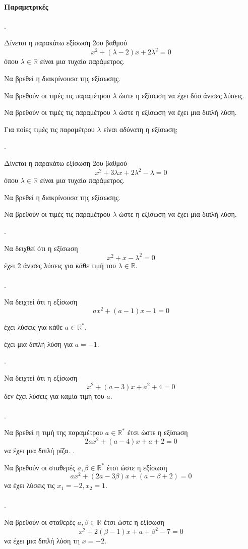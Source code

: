 \documentclass[11pt,a4paper,twocolumn]{article}
\newcounter{askhsh}
\newcommand{\askhsh}{{\large\theaskhsh.}\ \addtocounter{askhsh}{1}}
\begin{document}
\paragraph{Παραμετρικές}
\askhsh
Δίνεται η παρακάτω εξίσωση 2{ου} βαθμού
\[ x^2+(\lambda-2) x+2\lambda^2=0 \]
όπου $ \lambda\in\mathbb{R} $ είναι μια τυχαία παράμετρος.
\begin{alist}
\item Να βρεθεί η διακρίνουσα της εξίσωσης.
\item Να βρεθούν οι τιμές τις παραμέτρου $ \lambda $ ώστε η εξίσωση να έχει δύο άνισες λύσεις.
\item Να βρεθούν οι τιμές τις παραμέτρου $ \lambda $ ώστε η εξίσωση να έχει μια διπλή λύση.
\item Για ποίες τιμές τις παραμέτρου $ \lambda $ είναι αδύνατη η εξίσωση;
\end{alist}
\askhsh Δίνεται η παρακάτω εξίσωση 2{ου} βαθμού
\[ x^2+3\lambda x+2\lambda^2-\lambda=0 \]
όπου $ \lambda\in\mathbb{R} $ είναι μια τυχαία παράμετρος.
\begin{alist}
\item Να βρεθεί η διακρίνουσα της εξίσωσης.
\item Να βρεθούν οι τιμές τις παραμέτρου $ \lambda $ ώστε η εξίσωση να έχει μια διπλή λύση.
\end{alist}
\askhsh
Να δειχθεί ότι η εξίσωση
\[ x^2+x-\lambda^2=0 \]
έχει 2 άνισες λύσεις για κάθε τιμή του $ \lambda\in\mathbb{R} $.\\\\
\askhsh
Να δειχτεί ότι η εξίσωση
\[ ax^2+(a-1)x-1=0 \]
\begin{alist}
\item έχει λύσεις για κάθε $ a\in\mathbb{R}^* $.
\item έχει μια διπλή λύση για $ a=-1 $.
\end{alist}
\askhsh
Να δειχτεί ότι η εξίσωση
\[ x^2+(a-3) x+a^2+4=0 \]
δεν έχει λύσεις για καμία τιμή του $ a $.\\\\
\askhsh
Να βρεθεί η τιμή της παραμέτρου $ a\in\mathbb{R}^* $ έτσι ώστε η εξίσωση
\[ 2ax^2+(a-4)x+a+2=0 \]
να έχει μια διπλή ρίζα.
\askhsh
Να βρεθούν οι σταθερές $ a,\beta\in\mathbb{R}^* $ έτσι ώστε η εξίσωση
\[ ax^2+(2a-3\beta)x+(a-\beta+2)=0 \] 
να έχει λύσεις τις $ x_1=-2, x_2=1 $.\\\\
\askhsh
Να βρεθούν οι σταθερές $ a, \beta\in\mathbb{R} $ έτσι ώστε η εξίσωση
 \[ x^2+2(\beta-1)x+a+\beta^2-7=0 \] 
 να έχει μια διπλή λύση τη $ x=-2$.\\\\
\end{document}

